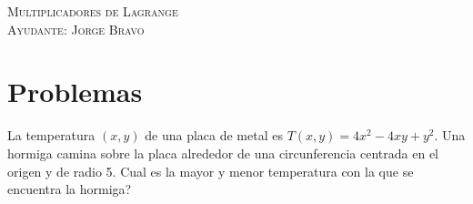 \documentclass[a4paper,oneside,10.5pt]{article}
\begin{document}
\begin{center}
{\Large \textsc{Multiplicadores de Lagrange}}\\
\vspace{1em}
\textsc{Ayudante: Jorge Bravo}\\
\end{center}

\section*{Problemas}
\begin{prob}
    La temperatura $(x, y)$ de una placa de metal es $T(x, y) = 4x^2 - 4xy + y^2$. Una hormiga camina sobre la placa alrededor de una circunferencia centrada en el origen y de radio 5. Cual es la mayor y menor temperatura con la que se encuentra la hormiga?
\end{prob}
\end{document}
